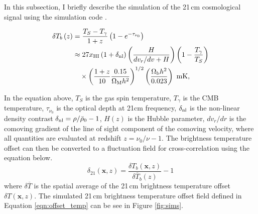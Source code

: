 \label{sec:21cm_temp}

In this subsection, I briefly describe the simulation of the 21\,cm cosmological
signal using the simulation code \fastsim.

\begin{align}
  \delta T_b \left(z \right) & = \frac{T_S - T_{\gamma}}{1+z} \left(1 - e^{-\tau_{\nu_0}} \right ) \nonumber \\
      & \approx 27 x_{\rm HI} \left( 1 + \delta_{\rm nl} \right) \left( \frac{H}{dv_r/dv + H}\right) \left( 1 - \frac{T_{\gamma}}{T_S}\right) \nonumber \\
      & \hspace{1em} \times \left( \frac{1 + z}{10} \frac{0.15}{\Omega_{\rm M} h^2} \right)^{1/2} \left( \frac{\Omega_{\rm b} h^2}{0.023} \right) \textrm{ mK,}
      \label{eqn:offset_temp}
\end{align}

In the equation above, $T_S$ is the gas spin temperature, $T_{\gamma}$ is the
CMB temperature, $\tau_{\nu_0}$ is the optical depth at 21cm frequency, $\delta_{\rm nl}$
is the non-linear density contrast $\delta_{\rm nl} = \rho / \bar{\rho}_0 - 1$, $H \left( z \right)$
is the Hubble parameter, $dv_r / dr$ is the comoving gradient of the line of sight component
of the comoving velocity, where all quantities are evaluated at redshift $z = \nu_0 / \nu - 1$.
The brightness temperature offset can then be converted to a fluctuation field
for cross-correlation using the equation below.
\begin{equation}
\delta_{21} \left( \mathbf{x}, z\right) = \frac{ \delta T_b \left( \mathbf{x}, z\right)}{\delta \overline{T}_b \left( z \right)} - 1
\end{equation}
where $\delta \overline{T}$ is the spatial average of the 21\,cm brightness temperature offset
$\delta T \left( \mathbf{x}, z\right)$. The simulated 21\,cm brightness temperature offset field defined
in Equation \ref{eqn:offset_temp} can be see in Figure \ref{fig:sims}.
